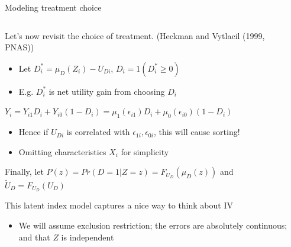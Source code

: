 \documentclass[notes,11pt, aspectratio=169]{beamer}
\newenvironment{wideitemize}{\itemize\addtolength{\itemsep}{10pt}}{\enditemize}
\begin{document}
\begin{frame}{Modeling treatment choice}
  \begin{columns}[T] %
    \begin{column}{0.95\textwidth}
      \begin{wideitemize}
      \item Let's now revisit the choice of treatment. (Heckman and Vytlacil (1999, PNAS))
        \begin{itemize}
        \item Let $D_{i}^{*} = \mu_{D}(Z_{i}) - U_{Di}$, $D_{i} = 1(D_{i}^{*} \ge 0)$
          \item E.g. $D_{i}^{*}$ is net utility gain from choosing $D_{i}$
          \end{itemize}
        \item $Y_{i} = Y_{i1}D_{i} + Y_{i0}(1-D_{i}) = \mu_{1}(\epsilon_{i1})D_{i} + \mu_{0}(\epsilon_{i0})(1-D_{i})$
          \begin{itemize}
          \item Hence if $U_{Di}$ is correlated with
            $ \epsilon_{1i},\epsilon_{0i}$, this will cause sorting!
          \item Omitting characteristics $X_{i}$ for simplicity
          \end{itemize}
        \item Finally, let $P(z) = Pr(D = 1 | Z = z) = F_{U_{D}}(\mu_{D}(z))$ and $\tilde{U}_{D} = F_{U_{D}}(U_{D})$
        \item This latent index model captures a nice way to think about IV
          \begin{itemize}
          \item We will assume exclusion restriction; the errors are
            absolutely continuous; and that $Z$ is independent
          \end{itemize}
      \end{wideitemize}
\end{column}
\begin{column}{0.4\textwidth}
\end{column}
\end{columns}
\end{frame}
\end{document}

